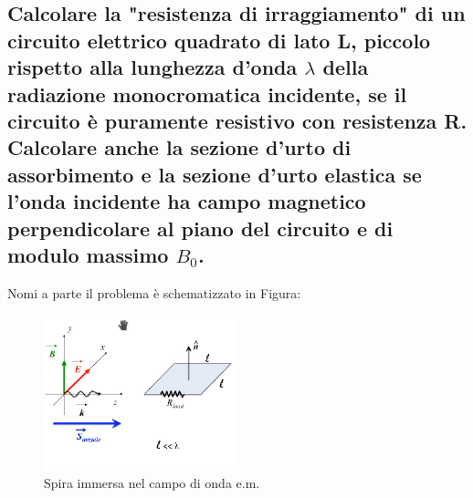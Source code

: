 \subsection[ Calcolo della resistenza di irraggiamento per spira investita da onda E.M.]{Calcolare la "resistenza di irraggiamento" di un circuito elettrico quadrato di lato L, piccolo rispetto alla lunghezza d'onda $\lambda$ della radiazione monocromatica incidente, se il circuito è puramente resistivo con resistenza R.\\
Calcolare anche la sezione d'urto di assorbimento e la sezione d'urto elastica se l'onda incidente ha campo magnetico perpendicolare al piano del circuito e di modulo massimo $B_0$. }
Nomi a parte il problema è schematizzato in Figura:
\begin{figure}[H]
	\centering
	\includegraphics[width=0.5\textwidth]{immagini/spira_onda.png}
	\caption{Spira immersa nel campo di onda e.m.}
	\label{fig:spira1}
\end{figure}
